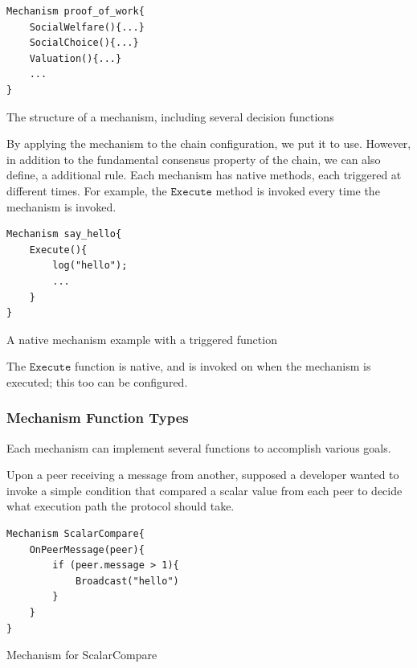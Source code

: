 \documentclass[12pt, titlepage, twocolumn]{report}
\begin{document}
\begin{listing}[ht]
\begin{minipage}{\linewidth}
\begin{lstlisting}
Mechanism proof_of_work{
	SocialWelfare(){...}
	SocialChoice(){...}
	Valuation(){...}
	...	
}
\end{lstlisting}
\end{minipage}
\caption{The structure of a mechanism, including several decision functions}
\label{code:5}
\end{listing}

By applying the mechanism to the chain configuration, we put it to use. However, in addition to the fundamental consensus property of the chain, we can also define, a additional rule. Each mechanism has native methods, each triggered at different times. For example, the \(\texttt{Execute}\) method is invoked every time the mechanism is invoked.

\begin{listing}[ht]
\begin{minipage}{\linewidth}
\begin{lstlisting}
Mechanism say_hello{
	Execute(){
		log("hello");
		...
	}
}
\end{lstlisting}
\end{minipage}
\caption{A native mechanism example with a triggered function}
\label{code:6}
\end{listing}

The \(\texttt{Execute}\) function is native, and is invoked on when the mechanism is executed; this too can be configured.

\subsubsection{Mechanism Function Types}
Each mechanism can implement several functions to accomplish various goals. 

Upon a peer receiving a message from another, supposed a developer wanted to invoke a simple condition that compared a scalar value from each peer to decide what execution path the protocol should take.

\begin{listing}[ht]
\begin{minipage}{\linewidth}
\begin{lstlisting}
Mechanism ScalarCompare{
	OnPeerMessage(peer){
		if (peer.message > 1){
			Broadcast("hello")
		}
	}
}
\end{lstlisting}
\end{minipage}
\caption{Mechanism for ScalarCompare}
\label{code:7}
\end{listing}
\end{document}
